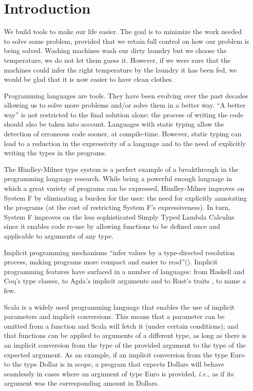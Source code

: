 \chapter{Introduction}
\label{cha:intro}
We build tools to make our life easier. The goal is to minimize the work needed to solve some problem, provided that we retain full control on how our problem is being solved. Washing machines wash our dirty laundry but we choose the temperature, we do not let them guess it. However, if we were sure that the machines could infer the right temperature by the laundry it has been fed, we would be glad that it is now easier to have clean clothes.

Programming languages are tools. They have been evolving over the past decades allowing us to solve more problems and/or solve them in a better way. ``A better way'' is not restricted to the final solution alone: the process of writing the code should also be taken into account. Languages with static typing allow the detection of erroneous code sooner, at compile-time. However, static typing can lead to a reduction in the expressivity of a language and to the need of explicitly writing the types in the programs.

The Hindley-Milner type system \cite{damas,hm2,hm3} is a perfect example of a breakthrough in the programming language research. While being a powerful enough language in which a great variety of programs can be expressed, Hindley-Milner improves on System F by eliminating a burden for the user: the need for explicitly annotating the programs (at the cost of restricting System F's expressiveness).  In turn, System F improves on the less sophisticated Simply Typed Lambda Calculus since it enables code re-use by allowing functions to be defined once and applicable to arguments of any type.

Implicit programming mechanisms ``infer values by a type-directed resolution process, making programs more compact and easier to read''(\cite{cochis}). Implicit programming features have surfaced in a number of languages: from Haskell \cite{adhoc} and Coq's \cite{coq} type classes, to Agda's implicit arguments \cite{agda} and to Rust's traits \cite{rust}, to name a few. 

Scala \cite{scala} is a widely used programming language that enables the use of implicit parameters and implicit conversions. This means that a parameter can be omitted from a function and Scala will fetch it (under certain conditions); and that functions can be applied to arguments of a different type, as long as there is an implicit conversion from the type of the provided argument to the type of the expected argument. As an example, if an implicit conversion from the type Euro to the type Dollar is in scope, a program that expects Dollars  will behave seamlessly in cases where an argument of type Euro is provided, \textit{i.e.}, as if its argument was the corresponding amount in Dollars.

